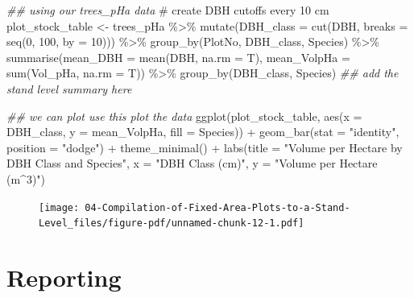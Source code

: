 \documentclass[
  letterpaper,
]{book}
\newenvironment{Shaded}{\begin{snugshade}}{\end{snugshade}}
\newcommand{\AttributeTok}[1]{\textcolor[rgb]{0.40,0.45,0.13}{#1}}
\newcommand{\CommentTok}[1]{\textcolor[rgb]{0.37,0.37,0.37}{#1}}
\newcommand{\DecValTok}[1]{\textcolor[rgb]{0.68,0.00,0.00}{#1}}
\newcommand{\DocumentationTok}[1]{\textcolor[rgb]{0.37,0.37,0.37}{\textit{#1}}}
\newcommand{\FunctionTok}[1]{\textcolor[rgb]{0.28,0.35,0.67}{#1}}
\newcommand{\NormalTok}[1]{\textcolor[rgb]{0.00,0.23,0.31}{#1}}
\newcommand{\OtherTok}[1]{\textcolor[rgb]{0.00,0.23,0.31}{#1}}
\newcommand{\SpecialCharTok}[1]{\textcolor[rgb]{0.37,0.37,0.37}{#1}}
\newcommand{\StringTok}[1]{\textcolor[rgb]{0.13,0.47,0.30}{#1}}
\begin{document}
\begin{Shaded}
\begin{Highlighting}[]
\DocumentationTok{\#\# using our trees\_pHa data}
\CommentTok{\# create DBH cutoffs every 10 cm}
\NormalTok{plot\_stock\_table }\OtherTok{\textless{}{-}}\NormalTok{ trees\_pHa }\SpecialCharTok{\%\textgreater{}\%} 
  \FunctionTok{mutate}\NormalTok{(}\AttributeTok{DBH\_class =} \FunctionTok{cut}\NormalTok{(DBH, }\AttributeTok{breaks =} \FunctionTok{seq}\NormalTok{(}\DecValTok{0}\NormalTok{, }\DecValTok{100}\NormalTok{, }\AttributeTok{by =} \DecValTok{10}\NormalTok{))) }\SpecialCharTok{\%\textgreater{}\%}
  \FunctionTok{group\_by}\NormalTok{(PlotNo, DBH\_class, Species) }\SpecialCharTok{\%\textgreater{}\%}
  \FunctionTok{summarise}\NormalTok{(}\AttributeTok{mean\_DBH =} \FunctionTok{mean}\NormalTok{(DBH, }\AttributeTok{na.rm =}\NormalTok{ T),}
            \AttributeTok{mean\_VolpHa =} \FunctionTok{sum}\NormalTok{(Vol\_pHa, }\AttributeTok{na.rm =}\NormalTok{ T)) }\SpecialCharTok{\%\textgreater{}\%} 
  \FunctionTok{group\_by}\NormalTok{(DBH\_class, Species) }
  \DocumentationTok{\#\# add the stand level summary here}

\DocumentationTok{\#\# we can plot use this plot the data }
\FunctionTok{ggplot}\NormalTok{(plot\_stock\_table, }\FunctionTok{aes}\NormalTok{(}\AttributeTok{x =}\NormalTok{ DBH\_class, }\AttributeTok{y =}\NormalTok{ mean\_VolpHa, }\AttributeTok{fill =}\NormalTok{ Species)) }\SpecialCharTok{+} 
  \FunctionTok{geom\_bar}\NormalTok{(}\AttributeTok{stat =} \StringTok{"identity"}\NormalTok{, }\AttributeTok{position =} \StringTok{"dodge"}\NormalTok{) }\SpecialCharTok{+} 
  \FunctionTok{theme\_minimal}\NormalTok{() }\SpecialCharTok{+} 
  \FunctionTok{labs}\NormalTok{(}\AttributeTok{title =} \StringTok{"Volume per Hectare by DBH Class and Species"}\NormalTok{, }
       \AttributeTok{x =} \StringTok{"DBH Class (cm)"}\NormalTok{, }\AttributeTok{y =} \StringTok{"Volume per Hectare (m\^{}3)"}\NormalTok{)}
\end{Highlighting}
\end{Shaded}

\begin{figure}[H]

{\centering \texttt{[image: 04-Compilation-of-Fixed-Area-Plots-to-a-Stand-Level\_files/figure-pdf/unnamed-chunk-12-1.pdf]}

}

\end{figure}

\hypertarget{reporting}{%
\section*{Reporting}\label{reporting}}
\end{document}
